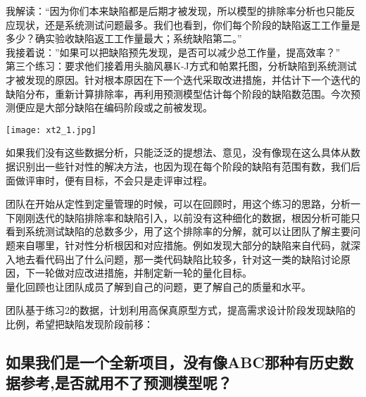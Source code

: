 我解读：``因为你们本来缺陷都是后期才被发现，所以模型的排除率分析也只能反应现状，还是系统测试问题最多。我们也看到，你们每个阶段的缺陷返工工作量是多少？确实验收缺陷返工工作量最大；系统缺陷第二。''\\
我接着说：''如果可以把缺陷预先发现，是否可以减少总工作量，提高效率？''\\
第三个练习：要求他们接着用头脑风暴K-J方式和帕累托图，分析缺陷到系统测试才被发现的原因。针对根本原因在下一个迭代采取改进措施，并估计下一个迭代的缺陷分布，重新计算排除率，再利用预测模型估计每个阶段的缺陷数范围。今次预测便应是大部分缺陷在编码阶段或之前被发现。


\texttt{[image: xt2\_1.jpg]}

如果我们没有这些数据分析，只能泛泛的提想法、意见，没有像现在这么具体从数据识别出一些针对性的解决方法，也因为现在每个阶段的缺陷有范围有数，我们后面做评审时，便有目标，不会只是走评审过程。

团队在开始从定性到定量管理的时候，可以在回顾时，用这个练习的思路，分析一下刚刚迭代的缺陷排除率和缺陷引入，以前没有这种细化的数据，根因分析可能只看到系统测试缺陷的总数多少，用了这个排除率的分解，就可以让团队了解主要问题来自哪里，针对性分析根因和对应措施。例如发现大部分的缺陷来自代码，就深入地去看代码出了什么问题，那一类代码缺陷比较多，针对这一类的缺陷讨论原因，下一轮做对应改进措施，并制定新一轮的量化目标。\\
量化回顾也让团队成员了解到自己的问题，更了解自己的质量和水平。

团队基于练习2的数据，计划利用高保真原型方式，提高需求设计阶段发现缺陷的比例，希望把缺陷发现阶段前移：



\hypertarget{ux5982ux679cux6211ux4eecux662fux4e00ux4e2aux5168ux65b0ux9879ux76eeux6ca1ux6709ux50cfabcux90a3ux79cdux6709ux5386ux53f2ux6570ux636eux53c2ux8003ux662fux5426ux5c31ux7528ux4e0dux4e86ux9884ux6d4bux6a21ux578bux5462}{%
\subsection{如果我们是一个全新项目，没有像ABC那种有历史数据参考,是否就用不了预测模型呢？}\label{ux5982ux679cux6211ux4eecux662fux4e00ux4e2aux5168ux65b0ux9879ux76eeux6ca1ux6709ux50cfabcux90a3ux79cdux6709ux5386ux53f2ux6570ux636eux53c2ux8003ux662fux5426ux5c31ux7528ux4e0dux4e86ux9884ux6d4bux6a21ux578bux5462}}

